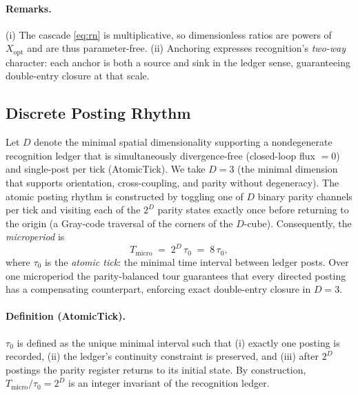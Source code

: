 \documentclass[11pt]{article}
\theoremstyle{definition}
\theoremstyle{remark}
\begin{document}
\paragraph{Remarks.}
(i) The cascade \eqref{eq:rn} is multiplicative, so dimensionless ratios are powers of $X_{\mathrm{opt}}$ and are thus parameter-free. (ii) Anchoring expresses recognition’s \emph{two-way} character: each anchor is both a source and sink in the ledger sense, guaranteeing double-entry closure at that scale.

\subsection{Discrete Posting Rhythm}
Let $D$ denote the minimal spatial dimensionality supporting a nondegenerate recognition ledger that is simultaneously divergence-free (closed-loop flux $=0$) and single-post per tick (AtomicTick). We take $D=3$ (the minimal dimension that supports orientation, cross-coupling, and parity without degeneracy). The atomic posting rhythm is constructed by toggling one of $D$ binary parity channels per tick and visiting each of the $2^D$ parity states exactly once before returning to the origin (a Gray-code traversal of the corners of the $D$-cube). Consequently, the \emph{microperiod} is
\begin{equation}
\label{eq:microperiod}
T_{\mathrm{micro}} \;=\; 2^D\,\tau_0 \;=\; 8\,\tau_0,
\end{equation}
where $\tau_0$ is the \emph{atomic tick}: the minimal time interval between ledger posts. Over one microperiod the parity-balanced tour guarantees that every directed posting has a compensating counterpart, enforcing exact double-entry closure in $D=3$.

\paragraph{Definition (AtomicTick).}
$\tau_0$ is defined as the unique minimal interval such that (i) exactly one posting is recorded, (ii) the ledger’s continuity constraint is preserved, and (iii) after $2^D$ postings the parity register returns to its initial state. By construction, $T_{\mathrm{micro}}/\tau_0=2^D$ is an integer invariant of the recognition ledger.
\end{document}
